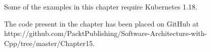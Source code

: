 Some of the examples in this chapter require Kubernetes 1.18.

The code present in the chapter has been placed on GitHub at https://github.com/PacktPublishing/Software-Architecture-with-Cpp/tree/master/Chapter15.